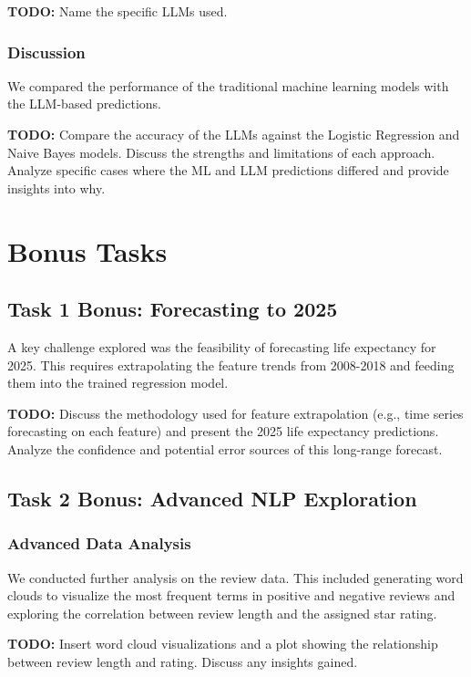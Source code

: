 \documentclass{article}
\begin{document}
\textbf{TODO:} Name the specific LLMs used.

\subsubsection{Discussion}
\label{sssec:discussion}
We compared the performance of the traditional machine learning models with the LLM-based predictions.

\textbf{TODO:} Compare the accuracy of the LLMs against the Logistic Regression and Naive Bayes models. Discuss the strengths and limitations of each approach. Analyze specific cases where the ML and LLM predictions differed and provide insights into why.

\section{Bonus Tasks}
\label{sec:bonus}

\subsection{Task 1 Bonus: Forecasting to 2025}
A key challenge explored was the feasibility of forecasting life expectancy for 2025. This requires extrapolating the feature trends from 2008-2018 and feeding them into the trained regression model.

\textbf{TODO:} Discuss the methodology used for feature extrapolation (e.g., time series forecasting on each feature) and present the 2025 life expectancy predictions. Analyze the confidence and potential error sources of this long-range forecast.

\subsection{Task 2 Bonus: Advanced NLP Exploration}

\subsubsection{Advanced Data Analysis}
We conducted further analysis on the review data. This included generating word clouds to visualize the most frequent terms in positive and negative reviews and exploring the correlation between review length and the assigned star rating.

\textbf{TODO:} Insert word cloud visualizations and a plot showing the relationship between review length and rating. Discuss any insights gained.
\end{document}
